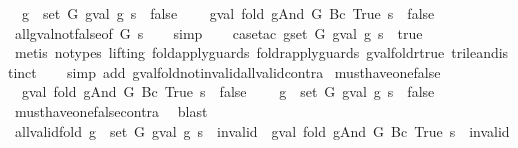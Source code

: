 \begin{isabellebody}
\ \ {\isachardoublequoteopen}{\isasymforall}g\ {\isasymin}\ set\ G{\isachardot}\ gval\ g\ s\ {\isasymnoteq}\ false\ {\isasymLongrightarrow}\isanewline
\ \ \ gval\ {\isacharparenleft}fold\ gAnd\ G\ {\isacharparenleft}Bc\ True{\isacharparenright}{\isacharparenright}\ s\ {\isasymnoteq}\ false{\isachardoublequoteclose}\isanewline
%
\isadelimproof
\ \ %
\endisadelimproof
%
\isatagproof
{}\isamarkupfalse%
\ all{\isacharunderscore}gval{\isacharunderscore}not{\isacharunderscore}false{\isacharbrackleft}of\ G\ s{\isacharbrackright}\isanewline
\ \ \isamarkupfalse%
\ simp\isanewline
\ \ \isamarkupfalse%
\ {\isacharparenleft}case{\isacharunderscore}tac\ {\isachardoublequoteopen}{\isacharparenleft}{\isasymforall}g{\isasymin}set\ G{\isachardot}\ gval\ g\ s\ {\isacharequal}\ true{\isacharparenright}{\isachardoublequoteclose}{\isacharparenright}\isanewline
\ \ \ \isamarkupfalse%
\ {\isacharparenleft}metis\ {\isacharparenleft}no{\isacharunderscore}types{\isacharcomma}\ lifting{\isacharparenright}\ fold{\isacharunderscore}apply{\isacharunderscore}guards\ foldr{\isacharunderscore}apply{\isacharunderscore}guards\ gval{\isacharunderscore}foldr{\isacharunderscore}true\ trilean{\isachardot}distinct{\isacharparenleft}{}{\isacharparenright}{\isacharparenright}\isanewline
\ \ \isamarkupfalse%
\ {\isacharparenleft}simp\ add{\isacharcolon}\ gval{\isacharunderscore}fold{\isacharunderscore}not{\isacharunderscore}invalid{\isacharunderscore}all{\isacharunderscore}valid{\isacharunderscore}contra{\isacharparenright}%
\endisatagproof
{\isafoldproof}%
%
\isadelimproof
\isanewline
%
\endisadelimproof
\isanewline
{}\isamarkupfalse%
\ must{\isacharunderscore}have{\isacharunderscore}one{\isacharunderscore}false{\isacharcolon}\isanewline
\ \ {\isachardoublequoteopen}gval\ {\isacharparenleft}fold\ gAnd\ G\ {\isacharparenleft}Bc\ True{\isacharparenright}{\isacharparenright}\ s\ {\isacharequal}\ false\ {\isasymLongrightarrow}\isanewline
\ \ \ {\isasymexists}g\ {\isasymin}\ set\ G{\isachardot}\ gval\ g\ s\ {\isacharequal}\ false{\isachardoublequoteclose}\isanewline
%
\isadelimproof
\ \ %
\endisadelimproof
%
\isatagproof
{}\isamarkupfalse%
\ must{\isacharunderscore}have{\isacharunderscore}one{\isacharunderscore}false{\isacharunderscore}contra\ \isamarkupfalse%
\ blast%
\endisatagproof
{\isafoldproof}%
%
\isadelimproof
\isanewline
%
\endisadelimproof
\isanewline
{}\isamarkupfalse%
\ all{\isacharunderscore}valid{\isacharunderscore}fold{\isacharcolon}\ {\isachardoublequoteopen}{\isasymforall}g\ {\isasymin}\ set\ G{\isachardot}\ gval\ g\ s\ {\isasymnoteq}\ invalid\ {\isasymLongrightarrow}\ gval\ {\isacharparenleft}fold\ gAnd\ G\ {\isacharparenleft}Bc\ True{\isacharparenright}{\isacharparenright}\ s\ {\isasymnoteq}\ invalid{\isachardoublequoteclose}\isanewline

\end{isabellebody}
